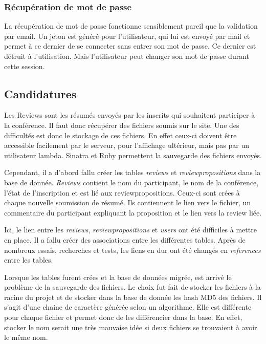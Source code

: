 \documentclass[a4paper,11pt]{article}
\begin{document}
\subsubsection{Récupération de mot de passe}

La récupération de mot de passe fonctionne sensiblement pareil que la validation par email. Un jeton est généré pour l'utilisateur, qui lui est envoyé par mail et permet à ce dernier de se connecter sans entrer son mot de passe. Ce dernier est détruit à l'utilisation. Mais l'utilisateur peut changer son mot de passe durant cette session.

\subsection{Candidatures}

Les Reviews sont les résumés envoyés par les inscrits qui souhaitent participer à la conférence. Il faut donc récupérer des fichiers soumis sur le site. Une des difficultés est donc le stockage de ces fichiers. En effet ceux-ci doivent être accessible facilement par le serveur, pour l'affichage ultérieur, mais pas par un utilisateur lambda. Sinatra et Ruby permettent la sauvegarde des fichiers envoyés. 


\bigbreak
Cependant, il a d'abord fallu créer les tables \textit{reviews} et \textit{reviewpropositions} dans la base de donnée. \textit{Reviews} contient le nom du participant, le nom de la conférence, l'état de l'inscription et est lié aux reviewpropositions. Ceux-ci sont crées à chaque nouvelle soumission de résumé. Ils contiennent le lien vers le fichier, un commentaire du participant expliquant la proposition et le lien vers la review liée. 

Ici, le lien entre les \textit{reviews}, \textit{reviewpropositions} et \textit{users} ont été difficiles à mettre en place. Il a fallu créer des associations entre les différentes tables. Après de nombreux essais, recherches et tests, les liens en dur ont été changés en \textit{references} entre les tables. 


\bigbreak
Lorsque les tables furent crées et la base de données migrée, est arrivé le problème de la sauvegarde des fichiers. Le choix fut fait de stocker les fichiers à la racine du projet et de stocker dans la base de donnée les hash MD5 des fichiers. Il s'agit d'une chaine de caractère générée selon un algorithme. Elle est différente pour chaque fichier et permet donc de les différencier dans la base. En effet, stocker le nom serait une très mauvaise idée si deux fichiers se trouvaient à avoir le même nom. 
\end{document}
